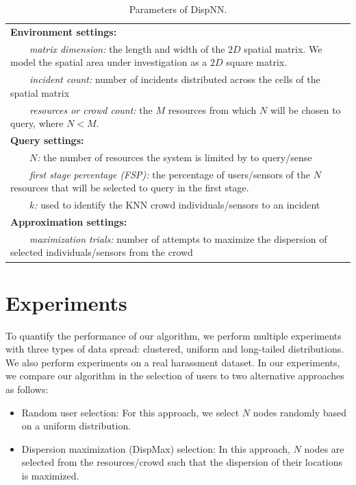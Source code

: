 \documentclass{acm_proc_article-sp}
\newcommand{\tabitem}{~~\llap{\textbullet}~~}
\begin{document}
\begin{table}{}
\centering
\begin{tabulary}{0.5\textwidth}{|L|}
\hline
\textbf{Environment settings:}\\
\tabitem \textit{matrix dimension:} the length and width of the $2D$ spatial matrix. We model the spatial area under investigation as a $2D$ square matrix.\\
\tabitem \textit{incident count:} number of incidents distributed across the cells of the spatial matrix\\
\tabitem \textit{resources or crowd count:} the $M$ resources from which $N$ will be chosen to query, where $N < M$.\\
\hline
\textbf{Query settings:}\\
\tabitem \textit{$N$:} the number of resources the system is limited by to query/sense \\
\tabitem \textit{first stage percentage (FSP):} the percentage of users/sensors of the $N$ resources that will be selected to query in the first stage.\\
\tabitem\textit{$k$:} used to identify the KNN crowd individuals/sensors to an incident\\
\hline
\textbf{Approximation settings: }\\
\tabitem \textit{maximization trials:} number of attempts to maximize the dispersion of selected individuals/sensors from the crowd\\
\hline
\end{tabulary}
\caption{Parameters of DispNN.}
\label{table:systemParameters}
\end{table}

\section{Experiments}
To quantify the performance of our algorithm, we perform multiple experiments with three types of data spread: clustered, uniform and long-tailed distributions. We also perform experiments on a real harassment dataset. In our experiments, we compare our algorithm in the selection of users to two alternative approaches as follows:
\begin{itemize}
\item Random user selection: For this approach, we select $N$ nodes randomly based on a uniform distribution.
\item Dispersion maximization (DispMax) selection: In this approach, $N$ nodes are selected from the resources/crowd such that the dispersion of their locations is maximized.
\end{itemize}
\end{document}
